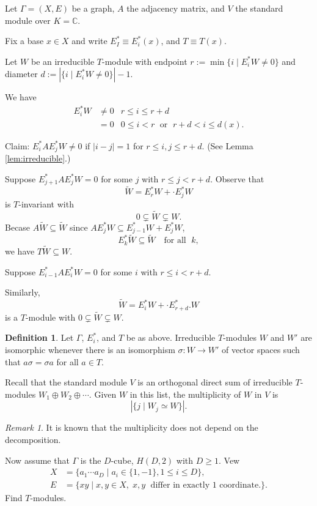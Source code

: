 \documentclass[
]{book}
\theoremstyle{definition}
\newtheorem{definition}{Definition}[chapter]
\theoremstyle{definition}
\theoremstyle{definition}
\theoremstyle{definition}
\theoremstyle{remark}
\newtheorem*{remark}{Remark}
\begin{document}
Let \(\Gamma = (X, E)\) be a graph, \(A\) the adjacency matrix, and \(V\) the standard module over \(K = \mathbb{C}\).

Fix a base \(x\in X\) and write \(E_I^* \equiv E_i^*(x)\), and \(T \equiv T(x)\).

Let \(W\) be an irreducible \(T\)-module with endpoint \(r:= \min\{i\mid E_i^*W \neq 0\}\) and diameter \(d:=|\{i\mid E_i^*W\neq 0\}|-1\).

We have
\begin{align}
E_i^*W & \neq 0 & r\leq i \leq r+d\\
& = 0 & 0 \leq i < r \;\text{ or }\; r+d < i \leq d(x).
\end{align}

Claim: \(E_i^*AE_j^*W \neq 0\) if \(|i-j| = 1\) for \(r\leq i,j\leq r+d\). (See Lemma \ref{lem:irreducible}.)

Suppose \(E_{j+1}^*AE_j^*W = 0\) for some \(j\) with \(r \leq j < r+d\).
Observe that
\[\tilde{W} = E^*_rW + \cdot E^*_jW\]
is \(T\)-invariant with
\[0 \subsetneq \tilde{W} \subsetneq W.\]
Becase \(A\tilde{W} \subseteq \tilde{W}\) since \(AE_j^*W \subseteq E^*_{j-1}W + E^*_jW\),
\[E_k^*\tilde{W} \subseteq \tilde{W} \quad\text{for all }\; k,\]
we have \(T\tilde{W} \subseteq{W}\).

Suppose \(E_{i-1}^*AE_i^*W = 0\) for some \(i\) with \(r \leq i < r+d\).

Similarly,
\[\tilde{W} = E^*_iW + \cdot E^*_{r+d}.W\]
is a \(T\)-module with \(0\subsetneq \tilde{W} \subsetneq W\).

\begin{definition}
\protect\hypertarget{def:isomorphic-modules}{}\label{def:isomorphic-modules}Let \(\Gamma\), \(E^*_i\), and \(T\) be as above. Irreducible \(T\)-modules \(W\) and \(W'\) are isomorphic whenever there is an isomorphism \(\sigma: W \to W'\) of vector spaces such that \(a\sigma = \sigma a\) for all \(a\in T\).
\end{definition}

Recall that the standard module \(V\) is an orthogonal direct sum of irreducible \(T\)-modules \(W_1 \oplus W_2 \oplus \cdots\). Given \(W\) in this list, the multiplicity of \(W\) in \(V\) is
\[|\{j \mid W_j \simeq W\}|.\]

\begin{remark}
It is known that the multiplicity does not depend on the decomposition.
\end{remark}

Now assume that \(\Gamma\) is the \(D\)-cube, \(H(D,2)\) with \(D\geq 1\). Vew
\begin{align}
X & = \{a_1\cdots a_D\mid a_i\in \{1, -1\}, 1\leq i\leq D\},\\
E & = \{xy\mid x, y\in X, \; x, y \;\text{ differ in exactly 1 coordinate.}\}.
\end{align}
Find \(T\)-modules.
\end{document}
